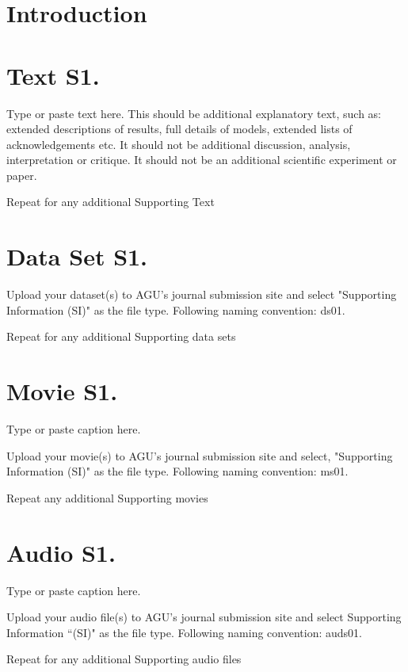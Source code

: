 \documentclass{agujournal2018}
\begin{document}
\section*{Introduction}


\section*{Text S1.}

Type or paste text here. This should be additional explanatory text,
such as: extended descriptions of results, full details of models,
extended lists of acknowledgements etc.  It should not be
additional discussion, analysis, interpretation or critique. It
should not be an additional scientific experiment or paper.

Repeat for any additional Supporting Text


\section*{Data Set S1.} %

Upload your dataset(s) to AGU's journal submission site and select
"Supporting Information (SI)" as the file type. Following naming
convention: ds01.

Repeat for any additional Supporting data sets

\section*{Movie S1.} 

Type or paste caption here.

Upload your movie(s) to AGU's journal submission site and select,
"Supporting Information (SI)" as the file type. Following naming convention: ms01.

Repeat any additional Supporting movies

\section*{Audio S1.} 

Type or paste caption here.

Upload your audio file(s) to AGU's journal submission site and select
Supporting Information ``(SI)" as the file type. Following naming
convention: auds01.

Repeat for any additional Supporting audio files
\end{document}
